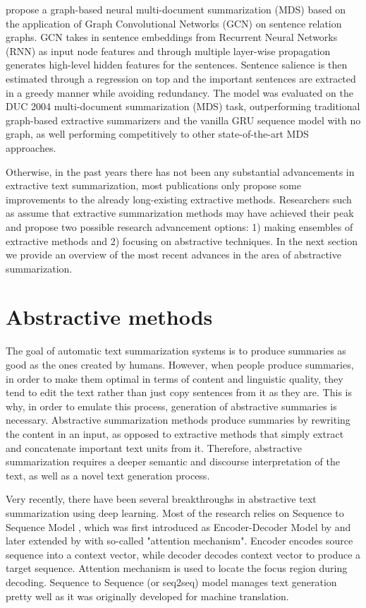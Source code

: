 \documentclass[11pt,a4paper,onecolumn]{article}
\begin{document}
\cite{yasunaga2017graph} propose a graph-based neural multi-document summarization (MDS) based on the application of Graph Convolutional Networks (GCN) \cite{kipf2016semi} on sentence relation graphs.
GCN takes in sentence embeddings from Recurrent Neural Networks (RNN) as input node features and through multiple layer-wise propagation generates high-level hidden features for the sentences.
Sentence salience is then estimated through a regression on top and the important sentences are extracted in a greedy manner while avoiding redundancy.
The model was evaluated on the DUC 2004 multi-document summarization (MDS) task, outperforming traditional graph-based extractive summarizers and the vanilla GRU sequence model with no graph, as well performing competitively to other state-of-the-art MDS approaches.

Otherwise, in the past years there has not been any substantial advancements in extractive text summarization, most publications only propose some improvements to the already long-existing extractive methods.
Researchers such as \cite{mehta2016extractive} assume that extractive summarization methods may have achieved their peak and propose two possible research advancement options:  1) making ensembles of extractive methods and 2) focusing on abstractive techniques.
In the next section we provide an overview of the most recent advances in the area of abstractive summarization.

\section{Abstractive methods} \label{abstractive}
The goal of automatic text summarization systems is to produce summaries as good as the ones created by humans.
However, when people produce summaries, in order to make them optimal in terms of content and linguistic quality, they tend to edit the text rather than just copy sentences from it as they are.
This is why, in order to emulate this process, generation of abstractive summaries is necessary.
Abstractive summarization methods produce summaries by rewriting the content in an input, as opposed to extractive methods that simply extract and concatenate important text units from it.
Therefore, abstractive summarization requires a deeper semantic and discourse interpretation of the text, as well as a novel text generation process.

Very recently, there have been several breakthroughs in abstractive text summarization using deep learning.
Most of the research relies on Sequence to Sequence Model \cite{sutskever2014sequence}, which was first introduced as Encoder-Decoder Model by \cite{cho2014learning} and later extended by \cite{bahdanau2014neural} with so-called "attention mechanism".
Encoder encodes source sequence into a context vector, while decoder decodes context vector to produce a target sequence. Attention mechanism is used to locate the focus region  during decoding.
Sequence to Sequence (or seq2seq) model manages text generation pretty well as it was originally developed for machine translation.
\end{document}
